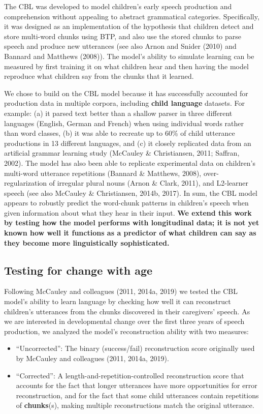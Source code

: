 \documentclass[man,mask,floatsintext]{apa6}
\providecommand{\tightlist}{%
  \setlength{\itemsep}{0pt}\setlength{\parskip}{0pt}}
\begin{document}
The CBL was developed to model children's early speech production and
comprehension without appealing to abstract grammatical categories.
Specifically, it was designed as an implementation of the hypothesis
that children detect and store multi-word chunks using BTP, and also use
the stored chunks to parse speech and produce new utterances (see also
Arnon and Snider (2010) and Bannard and Matthews (2008)). The model's
ability to simulate learning can be measured by first training it on
what children hear and then having the model reproduce what children say
from the chunks that it learned.

We chose to build on the CBL model because it has successfully accounted
for production data in multiple corpora, including \textbf{child
language} datasets. For example: (a) it parsed text better than a
shallow parser in three different languages (English, German and French)
when using individual words rather than word classes, (b) it was able to
recreate up to 60\% of child utterance productions in 13 different
languages, and (c) it closely replicated data from an artificial grammar
learning study (McCauley \& Christiansen, 2011; Saffran, 2002). The
model has also been able to replicate experimental data on children's
multi-word utterance repetitions (Bannard \& Matthews, 2008),
over-regularization of irregular plural nouns (Arnon \& Clark, 2011),
and L2-learner speech (see also McCauley \& Christiansen, 2014b, 2017).
In sum, the CBL model appears to robustly predict the word-chunk
patterns in children's speech when given information about what they
hear in their input. \textbf{We extend this work by testing how the
model performs with longitudinal data; it is not yet known how well it
functions as a predictor of what children can say as they become more
linguistically sophisticated.}

\subsection{Testing for change with
age}\label{testing-for-change-with-age}

Following McCauley and colleagues (2011, 2014a, 2019) we tested the CBL
model's ability to learn language by checking how well it can
reconstruct children's utterances from the chunks discovered in their
caregivers' speech. As we are interested in developmental change over
the first three years of speech production, we analyzed the model's
reconstruction ability with two measures:

\begin{itemize}
\tightlist
\item
  \enquote{Uncorrected}: The binary (success/fail) reconstruction score
  originally used by McCauley and colleagues (2011, 2014a, 2019).
\item
  \enquote{Corrected}: A length-and-repetition-controlled reconstruction
  score that accounts for the fact that longer utterances have more
  opportunities for error reconstruction, and for the fact that some
  child utterances contain repetitions of \textbf{chunks}(s), making
  multiple reconstructions match the original utterance.
\end{itemize}
\end{document}
